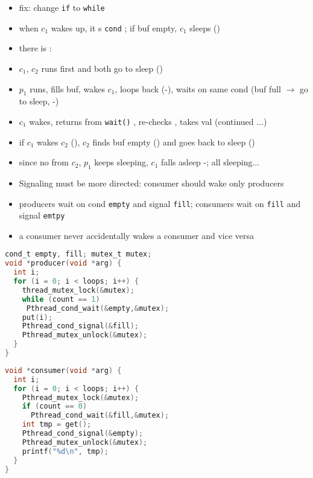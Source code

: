 \begin{minipage}{.4\linewidth}
  \flushleft
  \begin{itemize}
  \item fix: change \texttt{if} to \texttt{while}
  \item when $c_1$ wakes up, it s \texttt{cond} ; if buf empty, $c_1$ sleeps ()
  \item there is :
  \item $c_1$, $c_2$ runs first and both go to sleep ()
  \item $p_1$ runs, fills buf, wakes $c_1$, loops back (-), waits on same cond (buf full $\to$ go to sleep, -)
  \item $c_1$ wakes, returns from \texttt{wait()} , re-checks , takes val  (continued ...)
  \end{itemize}
\end{minipage}
\vspace{-.8em}
\begin{itemize}
\item if $c_1$ wakes $c_2$ (), $c_2$ finds buf empty () and goes back to sleep ()
\item since no  from $c_2$, $p_1$ keeps sleeping, $c_1$ falls asleep -; all sleeping...
\item Signaling must be more directed: consumer should wake only producers
\item producers wait on cond \texttt{empty} and signal \texttt{fill}; consumers wait on \texttt{fill} and signal \texttt{emtpy}
\item a consumer never accidentally wakes a consumer and vice versa
\end{itemize}
\begin{minipage}{.55\linewidth}
\begin{lstlisting}[language=c,xleftmargin=-1em,xrightmargin=-4pt,frame=lines]
cond_t empty, fill; mutex_t mutex;
void *producer(void *arg) {
  int i;
  for (i = 0; i < loops; i++) {
    thread_mutex_lock(&mutex);
    while (count == 1)
     Pthread_cond_wait(&empty,&mutex);
    put(i);
    Pthread_cond_signal(&fill);
    Pthread_mutex_unlock(&mutex);
  }
}
\end{lstlisting}
\end{minipage}
\begin{minipage}{.55\linewidth}
\begin{lstlisting}[language=c,xleftmargin=-2.8em,frame=lines]
void *consumer(void *arg) {
  int i;
  for (i = 0; i < loops; i++) {
    Pthread_mutex_lock(&mutex);
    if (count == 0)
      Pthread_cond_wait(&fill,&mutex);
    int tmp = get();
    Pthread_cond_signal(&empty);
    Pthread_mutex_unlock(&mutex);
    printf("%d\n", tmp);
  }
}
\end{lstlisting}
\end{minipage}
